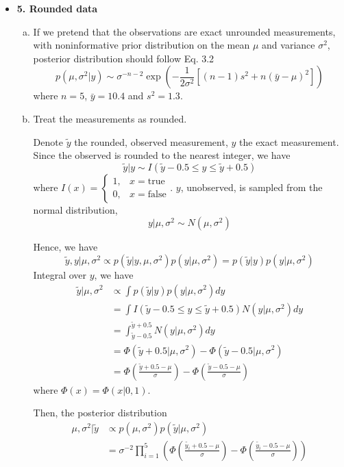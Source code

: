 \documentclass{article}
\begin{document}
\begin{itemize}
\begin{enumerate}[(a)]
\end{enumerate}

\item \textbf{5. Rounded data}

\begin{enumerate}[(a)]
\item If we pretend that the observations are exact unrounded measurements, with noninformative prior distribution on the mean $\mu$ and variance $\sigma^2$, posterior distribution should follow Eq. 3.2
$$
p(\mu, \sigma^2 | y) \sim \sigma^{-n-2} \exp \left(-\frac{1}{2\sigma^2} [(n-1) s^2 + n (\bar y - \mu)^2] \right)
$$
where $n=5$, $\bar y = 10.4$ and $s^2 = 1.3$.

\item Treat the measurements as rounded. 

Denote $\tilde y$ the rounded, observed measurement, $y$ the exact measurement. Since the observed is rounded to the nearest integer, we have
$$
\tilde y | y \sim I(\tilde y - 0.5 \leq y \leq  \tilde y + 0.5)
$$
where $I(x) = \begin{cases} 1, &x = \text{true} \\ 0, &x = \text{false} \end{cases}$. $y$, unobserved, is sampled from the normal distribution, 
$$
y | \mu, \sigma^2 \sim N(\mu, \sigma^2)
$$

Hence, we have 
$$
\tilde y, y | \mu, \sigma^2 \propto p(\tilde y | y, \mu, \sigma^2) p(y|\mu, \sigma^2) = p(\tilde y | y ) p(y|\mu, \sigma^2) 
$$
Integral over $y$, we have
\begin{align*}
\tilde y | \mu, \sigma^2 &\propto \int p(\tilde y | y ) p(y|\mu, \sigma^2) dy \\
&= \int I(\tilde y - 0.5 \leq y \leq  \tilde y + 0.5)N(y|\mu, \sigma^2) dy \\
&= \int_{\tilde y-0.5}^{\tilde y+0.5} N(y|\mu, \sigma^2) dy \\
&= \Phi (\tilde y + 0.5 | \mu, \sigma^2) - \Phi (\tilde y - 0.5 | \mu, \sigma^2) \\
&= \Phi \left(\frac{\tilde y + 0.5 - \mu}{\sigma} \right) - \Phi \left ( \frac{\tilde y - 0.5 - \mu}{\sigma} \right )
\end{align*}
where $\Phi(x) = \Phi(x | 0, 1)$.

Then, the posterior distribution
\begin{align*}
\mu, \sigma^2 | \tilde y &\propto p(\mu, \sigma^2) p(\tilde y | \mu, \sigma^2) \\
&=  \sigma^{-2} \prod_{i=1}^5 \left ( \Phi \left(\frac{\tilde {y_i} + 0.5 - \mu}{\sigma} \right) - \Phi \left ( \frac{\tilde {y_i} - 0.5 - \mu}{\sigma} \right ) \right )
\end{align*}


\end{enumerate}
\end{itemize}
\end{document}
